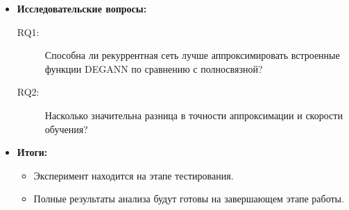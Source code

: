 \documentclass
  [ russian
  , aspectratio=1610 %
  ] {beamer}
\begin{document}
\begin{frame}
    \begin{itemize}
            \item \textbf{Исследовательские вопросы:}
        \begin{description}
            \item[RQ1:] Способна ли рекуррентная сеть лучше аппроксимировать встроенные функции DEGANN по сравнению с полносвязной?
            \item[RQ2:] Насколько значительна разница в точности аппроксимации и скорости обучения?
        \end{description}
        \item \textbf{Итоги:}
        \begin{itemize}
            \item Эксперимент находится на этапе тестирования.
            \item Полные результаты анализа будут готовы на завершающем этапе работы.
        \end{itemize}
    \end{itemize}
\end{frame}
\end{document}
